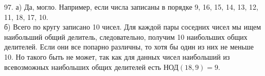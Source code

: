 97. а) Да, могло. Например, если числа записаны в порядке 9, 16, 15, 14, 13, 12, 11, 18, 17, 10.\\
б) Всего по кругу записано 10 чисел. Для каждой пары соседних чисел мы ищем наибольший общий делитель, следовательно, получим 10 наибольших общих делителей. Если они все попарно различны, то хотя бы один из них не меньше 10. Но такого быть не может, так как для данных чисел наибольший из всевозможных наибольших общих делителей есть НОД$(18,9) = 9.$\\
